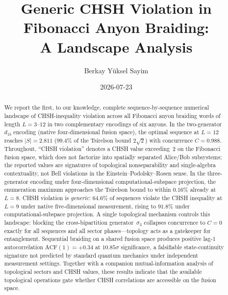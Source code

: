 \documentclass[aps,pra,twocolumn,superscriptaddress,longbibliography,floatfix,nofootinbib]{revtex4-2}
\begin{document}
\setcounter{secnumdepth}{3}

\title{Generic CHSH Violation in Fibonacci Anyon Braiding:\\
A Landscape Analysis}

\author{Berkay Y\"uksel Sayim}

\date{2026-07-23}

\begin{abstract}
We report the first, to our knowledge, complete sequence-by-sequence
numerical landscape of CHSH-inequality violation across all
Fibonacci anyon braiding words of length $L=3$--$12$ in two
complementary encodings of six anyons. In the two-generator $d_{1b}$
encoding (native four-dimensional fusion space), the optimal
sequence at $L=12$ reaches $|S|=2.811$ ($99.4\%$ of the Tsirelson
bound $2\sqrt{2}$) with concurrence $C=0.988$. Throughout, ``CHSH
violation'' denotes a CHSH value exceeding~2 on the Fibonacci fusion
space, which does not factorize into spatially separated Alice/Bob
subsystems; the reported values are signatures of topological
nonseparability and single-algebra contextuality, not Bell
violations in the Einstein--Podolsky--Rosen sense. In the
three-generator encoding under four-dimensional
computational-subspace projection, the enumeration maximum
approaches the Tsirelson bound to within $0.16\%$ already at $L=8$.
CHSH violation is \emph{generic}: $64.6\%$ of sequences violate the
CHSH inequality at $L=9$ under native five-dimensional measurement,
rising to $91.8\%$ under computational-subspace projection. A single
topological mechanism controls this landscape: blocking the
cross-bipartition generator~$\sigma_3$ collapses concurrence to
$C=0$ exactly for all sequences and all sector phases---topology
acts as a gatekeeper for entanglement. Sequential braiding on a
shared fusion space produces positive lag-1 autocorrelation
$\text{ACF}(1)=+0.34$ at $10.85\sigma$ significance, a falsifiable
state-continuity signature not predicted by standard quantum
mechanics under independent measurement settings. Together with a
companion mutual-information analysis of topological sectors and
CHSH values, these results indicate that the available topological
operations gate whether CHSH correlations are accessible on the
fusion space.
\end{abstract}

\end{document}
